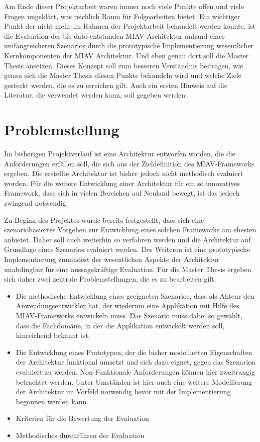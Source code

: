\documentclass[11pt,headsepline,a4paper,bibtotoc,liststotoc,DIV12,BCOR12mm]{scrartcl}
\begin{document}
  Am Ende dieser Projektarbeit waren immer noch viele Punkte offen und viele Fragen ungeklärt, was reichlich Raum für Folgearbeiten bietet. Ein wichtiger Punkt der nicht mehr im Rahmen der Projektarbeit behandelt werden konnte, ist die Evaluation der bis dato entstanden MIAV Architektur anhand eines umfangreicheren Szenarios durch die prototypische Implementierung wesentlicher Kernkomponenten der MIAV Architektur. Und eben genau dort soll die Master Thesis ansetzen. Dieses Konzept soll zum besseren Verständnis beitragen, wie genau sich die Master Thesis diesen Punkte behandeln wird und welche Ziele gesteckt werden, die es zu erreichen gilt. Auch ein ersten Hinweis auf die Literatur, die verwendet werden kann, soll gegeben werden.


\section{Problemstellung} %
\label{sec:problemstellung}

  Im bisherigen Projektverlauf ist eine Architektur entworfen worden, die die Anforderungen erfüllen soll, die sich aus der Zieldefinition des MIAV-Frameworks ergeben. Die erstellte Architektur ist bisher jedoch nicht methodisch evaluiert worden. Für die weitere Entwicklung einer Architektur für ein so innovatives Framework, dass sich in vielen Bereichen auf Neuland bewegt, ist das jedoch zwingend notwendig.
  
  Zu Beginn des Projektes wurde bereits festgestellt, dass sich eine szenariobasiertes Vorgehen zur Entwicklung eines solchen Frameworks am ehesten anbietet. Daher soll auch weiterhin so verfahren werden und die Architektur auf Grundlage eines Szenarios evaluiert werden. Des Weiteren ist eine prototypische Implementierung zumindest der wesentlichen Aspekte der Architektur unabdingbar für eine aussagekräftige Evaluation. Für die Master Thesis ergeben sich daher zwei zentrale Problemstellungen, die es zu bearbeiten gilt:
  
  \begin{itemize}
    \item Die methodische Entwicklung eines geeigneten Szenarios, dass als Akteur den Anwendungsentwickler hat, der wiederum eine Applikation mit Hilfe des MIAV-Frameworks entwickeln muss. Das Szenario muss dabei so gewählt, dass die Fachdomäne, in der die Applikation entwickelt werden soll, hinreichend bekannt ist.
    \item Die Entwicklung eines Prototypen, der die bisher modellierten Eigenschaften der Architektur funktional umsetzt und sich dazu eignet, gegen das Szenarion evaluiert zu werden. Non-Funktionale Anforderungen können hier zweitrangig betrachtet werden. Unter Umständen ist hier auch eine weitere Modellierung der Architektur im Vorfeld notwendig bevor mit der Implementierung begonnen werden kann.
    \item Kriterien für die Bewertung der Evaluation
    \item Methodisches durchführen der Evaluation
  \end{itemize}
\end{document}
